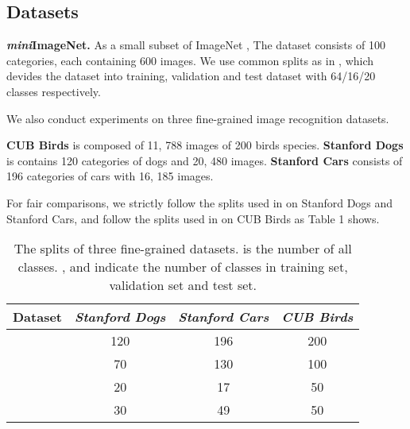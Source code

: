 \documentclass[final]{cvpr}
\begin{document}
	\subsection{Datasets}
	\textbf{\emph{mini}ImageNet.} As a small subset of ImageNet \cite{deng2009imagenet}, The dataset consists of 100 categories, each containing 600 images. We use common splits as in \cite{finn2017model}, which devides the dataset into training, validation and test dataset with 64/16/20 classes respectively.
	
	We also conduct experiments on three fine-grained image recognition datasets. 	
	
	\textbf{CUB Birds} \cite{wah2011caltech} is composed of 11, 788 images of 200 birds species. 
	\textbf{Stanford Dogs} \cite{khosla2011novel} is contains 120 categories of dogs and 20, 480 images. 
	\textbf{Stanford Cars} \cite{krause20133d} consists of 196 categories of cars with 16, 185 images. 	
	
	For fair comparisons, we strictly follow the splits used in \cite{li2019revisiting, li2019distribution} on Stanford Dogs and Stanford Cars, and follow the splits used in \cite{chen2019closer} on CUB Birds as Table 1 shows.
	\begin{table}[t]
		\centering
		\begin{tabular}{p{0.9cm}<{\centering}ccc}
			\toprule
			\textbf{Dataset} & \emph{\textbf{Stanford Dogs}}&\emph{\textbf{Stanford Cars}}&\emph{\textbf{CUB Birds}}
			\\
			\midrule
			&120&196&200\\
			&70&130&100\\
			&20&17&50\\
			&30&49&50\\
			\bottomrule
		\end{tabular}
		\caption{The splits of three fine-grained datasets.  is the number of all classes. ,  and  indicate the number of classes in training set, validation set and test set.}
	\end{table}
	
\end{document}
